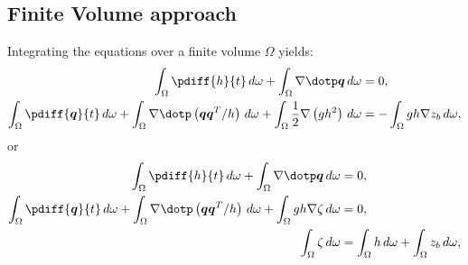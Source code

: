 \subsection*{Finite Volume approach}
Integrating the equations over a finite volume $\Omega$ yields:
\begin{subequations}
    \begin{align}
        \int_\Omega \pdiff{h}{t}\, d\omega
        + \int_\Omega \nabla \dotp \vec{q}\, d\omega & = 0,
        \label{eq:pressure_dependent_on_h_a} \\
        \int_\Omega \pdiff{\vec{q}}{t}\, d\omega
        + \int_\Omega \nabla \dotp \left( \vec{q}\vec{q}^T/h\right)\, d\omega
        + \int_\Omega \half  \nabla \left( g h^2 \right) \, d\omega & =
        - \int_\Omega gh\nabla z_b\, d\omega,
        \label{eq:pressure_dependent_on_h_b}
    \end{align}
    \label{eq:pressure_dependent_on_h}
\end{subequations}
or
\begin{subequations}
\begin{align}
    \int_\Omega \pdiff{h}{t}\, d\omega + \int_\Omega \nabla \dotp \vec{q}\, d\omega & = 0,
    \\
    \int_\Omega \pdiff{\vec{q}}{t}\, d\omega
    + \int_\Omega \nabla \dotp \left( \vec{q}\vec{q}^T/h\right)\, d\omega
    + \int_\Omega gh \nabla \zeta\, d\omega & = 0,
    \\
    \int_\Omega \zeta\, d\omega & = \int_\Omega h\, d\omega + \int_\Omega z_b\, d\omega,
\end{align}
\label{eq:pressure_dependent_on_zeta}
\end{subequations}

